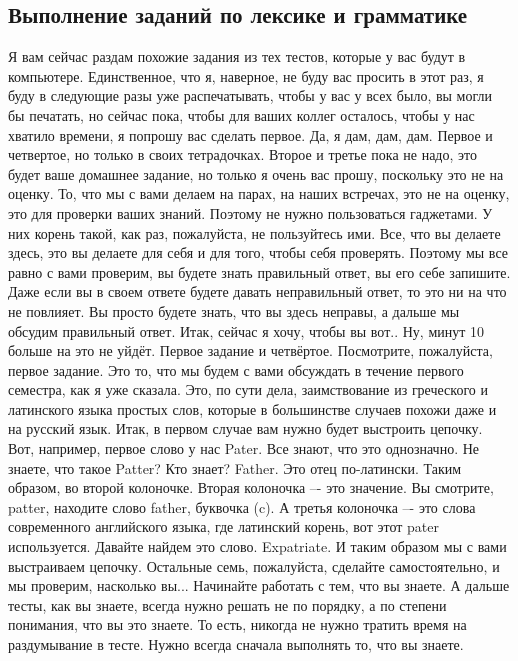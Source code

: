 \documentclass[main.tex]{subfiles}
\begin{document}
\subsection{Выполнение заданий по лексике и грамматике}

Я вам сейчас раздам похожие задания из тех тестов, которые у вас будут в компьютере.
Единственное, что я, наверное, не буду вас просить в этот раз, я буду в следующие разы уже распечатывать, чтобы у вас у всех было, вы могли бы печатать, но сейчас пока, чтобы для ваших коллег осталось, чтобы у нас хватило времени, я попрошу вас сделать первое.
Да, я дам, дам, дам.
Первое и четвертое, но только в своих тетрадочках.
Второе и третье пока не надо, это будет ваше домашнее задание, но только я очень вас прошу, поскольку это не на оценку.
То, что мы с вами делаем на парах, на наших встречах, это не на оценку, это для проверки ваших знаний.
Поэтому не нужно пользоваться гаджетами.
У них корень такой, как раз, пожалуйста, не пользуйтесь ими.
Все, что вы делаете здесь, это вы делаете для себя и для того, чтобы себя проверять.
Поэтому мы все равно с вами проверим, вы будете знать правильный ответ, вы его себе запишите.
Даже если вы в своем ответе будете давать неправильный ответ, то это ни на что не повлияет.
Вы просто будете знать, что вы здесь неправы, а дальше мы обсудим правильный ответ.
Итак, сейчас я хочу, чтобы вы вот..
Ну, минут 10 больше на это не уйдёт.
Первое задание и четвёртое.
Посмотрите, пожалуйста, первое задание.
Это то, что мы будем с вами обсуждать в течение первого семестра, как я уже сказала.
Это, по сути дела, заимствование из греческого и латинского языка простых слов, которые в большинстве случаев похожи даже и на русский язык.
Итак, в первом случае вам нужно будет выстроить цепочку.
Вот, например, первое слово у нас Pater.
Все знают, что это однозначно.
Не знаете, что такое Patter? Кто знает? Father.
Это отец по-латински.
Таким образом, во второй колоночке.
Вторая колоночка –- это значение.
Вы смотрите, patter, находите слово father, буквочка (c).
А третья колоночка –- это слова современного английского языка, где латинский корень, вот этот pater используется.
Давайте найдем это слово.
Expatriate.
И таким образом мы с вами выстраиваем цепочку.
Остальные семь, пожалуйста, сделайте самостоятельно, и мы проверим, насколько вы...
Начинайте работать с тем, что вы знаете.
А дальше тесты, как вы знаете, всегда нужно решать не по порядку, а по степени понимания, что вы это знаете.
То есть, никогда не нужно тратить время на раздумывание в тесте.
Нужно всегда сначала выполнять то, что вы знаете.
\\
\end{document}
